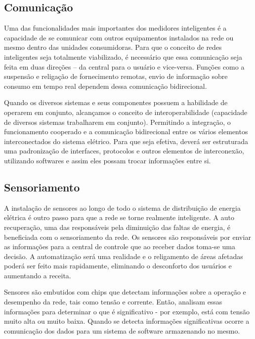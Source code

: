 \subsection{Comunicação}

	Uma das funcionalidades mais importantes dos medidores inteligentes é a capacidade de se comunicar com outros equipamentos instalados na rede ou mesmo dentro das unidades consumidoras. Para que o conceito de redes inteligentes seja totalmente viabilizado, é necessário que essa comunicação seja feita em duas direções – da central para o usuário e vice-versa. Funções como a suspensão e religação de fornecimento remotas, envio de informação sobre consumo em tempo real dependem dessa comunicação bidirecional.

	Quando os diversos sistemas e seus componentes possuem a habilidade de operarem em conjunto, alcançamos o conceito de interoperabilidade (capacidade de diversos sistemas trabalharem em conjunto). Permitindo a integração, o funcionamento cooperado e a comunicação bidirecional entre os vários elementos interconectados do sistema elétrico. Para que seja efetiva, deverá ser estruturada uma padronização de interfaces, protocolos e outros elementos de interconexão, utilizando softwares e assim eles possam trocar informações entre si.

\subsection{Sensoriamento}

	A instalação de sensores ao longo de todo o sistema de distribuição de energia elétrica é outro passo para que a rede se torne realmente inteligente. A auto recuperação, uma das responsáveis pela diminuição das faltas de energia, é beneficiada com o sensoriamento da rede. Os sensores são responsáveis por enviar as informações para a central de controle que ao receber dados toma-se uma decisão. A automatização será uma realidade e o religamento de áreas afetadas poderá ser feito mais rapidamente, eliminando o desconforto dos usuários e aumentando a receita.

	Sensores são embutidos com chips que detectam informações sobre a operação e desempenho da rede, tais como tensão e corrente. Então, analisam essas informações para determinar o que é significativo - por exemplo, está com tensão muito alta ou muito baixa. Quando se detecta informações significativas ocorre a comunicação dos dados para um sistema de software armazenando no mesmo\cite{2015Salema}.


